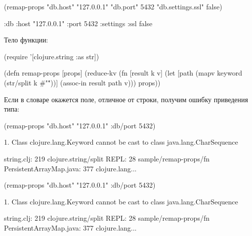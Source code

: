 \begin{english}
  \begin{clojure}
(remap-props
  {"db.host" "127.0.0.1"
   "db.port" 5432
   "db.settings.ssl" false})

{:db
 {:host "127.0.0.1"
  :port 5432
  :settings {:ssl false}}}
  \end{clojure}
\end{english}

Тело функции:

\begin{english}
  \begin{clojure}
(require '[clojure.string :as str])

(defn remap-props [props]
  (reduce-kv
   (fn [result k v]
     (let [path
           (mapv keyword (str/split k #"\."))]
       (assoc-in result path v)))
   {}
   props))
  \end{clojure}
\end{english}

Если в словаре окажется поле, отличное от строки, получим ошибку приведения типа:

\iflarge

\begin{english}
  \begin{text}
(remap-props {"db.host"
              "127.0.0.1"
              :db/port 5432})
  \end{text}
\end{english}

\begin{english}
  \begin{text}
1. Class clojure.lang.Keyword cannot be cast
   to class java.lang.CharSequence

                string.clj:  219  clojure.string/split
                      REPL:   28  sample/remap-props/fn
   PersistentArrayMap.java:  377  clojure.lang...
  \end{text}
\end{english}

\else

\begin{english}
  \begin{text}
(remap-props {"db.host"
              "127.0.0.1"
              :db/port 5432})

1. Class clojure.lang.Keyword cannot be cast
   to class java.lang.CharSequence

                string.clj:  219  clojure.string/split
                      REPL:   28  sample/remap-props/fn
   PersistentArrayMap.java:  377  clojure.lang...
  \end{text}
\end{english}

